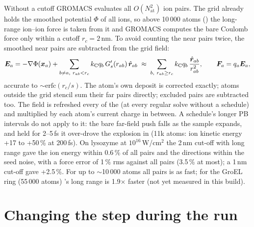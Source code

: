 Without a cutoff GROMACS evaluates all $O(N_{\mathrm{at}}^2)$ ion pairs.
The grid already holds the smoothed potential $\Phi$ of all ions, so above 10\,000 atoms
() the long-range ion--ion force is taken from it and GROMACS computes the bare Coulomb
force only within a cutoff $r_c = 2$\,nm.
To avoid counting the near pairs twice, the smoothed near pairs are subtracted from the grid field:
\begin{equation}
  \bm{E}_a = -\nabla\Phi(\bm{x}_a) + \sum_{b\ne a,\ r_{ab}<r_c}k_{\mathrm C} q_b\,G_s'(r_{ab})\,\hat{\bm{r}}_{ab}
  \;\approx\;\sum_{b,\ r_{ab}\ge r_c}k_{\mathrm C} q_b\,\frac{\hat{\bm{r}}_{ab}}{r_{ab}^2},\qquad \bm{F}_a = q_a\bm{E}_a,
\end{equation}
accurate to $\sim\mathrm{erfc}(r_c/s)$.
The atom's own deposit is corrected exactly; atoms outside the grid stencil sum their far pairs directly; excluded pairs
are subtracted too.
The field is refreshed every  of the  (at every regular solve without a schedule)
and multiplied by each atom's current charge in between.
A schedule's longer PB intervals do not apply to it: the bare far-field push falls as the sample expands, and held
for 2--5\,fs it over-drove the explosion in  (11k atoms: ion kinetic energy +17 to +50\,\% at 200\,fs).
On lysozyme at $10^{16}$\,W/cm$^2$ the 2\,nm cut-off with long range gave the ion energy within 0.6\,\% of all pairs and
the directions within the seed noise, with a force error of 1\,\% rms against all pairs (3.5\,\% at most); a 1\,nm
cut-off gave +2.5\,\%.
For up to $\sim$10\,000 atoms all pairs is as fast; for the GroEL ring (55\,000 atoms) 's long range is
1.9$\times$ faster (not yet measured in this build).

\section{Changing the step during the run}
\label{sec:schedule-num}

